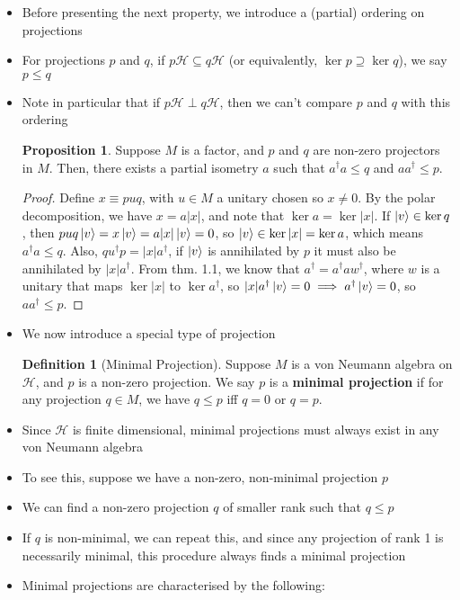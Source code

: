\documentclass[12pt,a4paper]{article}
\numberwithin{equation}{section}
\theoremstyle{definition}
\newtheorem{definition}{Definition}[section]
\theoremstyle{theorem}
\newtheorem{proposition}{Proposition}
\begin{document}
\begin{itemize}
\begin{proof}
		\end{proof}
		\item Before presenting the next property, we introduce a (partial) ordering on projections
		\item For projections $p$ and $q$, if $p\mathcal{H}\subseteq q\mathcal{H}$ (or equivalently, $\ker{p}\supseteq\ker{q}$), we say $p\leq q$
		\item Note in particular that if $p\mathcal{H}\perp q\mathcal{H}$, then we can't compare $p$ and $q$ with this ordering
		\begin{proposition}
			Suppose $M$ is a factor, and $p$ and $q$ are non-zero projectors in $M$. Then, there exists a partial isometry $a$ such that $a^{\dagger}a\leq q$ and $aa^{\dagger}\leq p$.
		\end{proposition}
		\begin{proof}
			Define $x\equiv puq$, with $u\in M$ a unitary chosen so $x\neq 0$. By the polar decomposition, we have $x=a|x|$, and note that $\ker{a}=\ker{|x|}$. If $\ket{v}\in \ker{q}$, then $puq\ket{v}=x\ket{v}=a|x|\ket{v}=0$, so $\ket{v}\in \ker{|x|}=\ker{a}$, which means $a^{\dagger}a\leq q$. Also, $qu^{\dagger}p=|x|a^{\dagger}$, if $\ket{v}$ is annihilated by $p$ it must also be annihilated by $|x|a^{\dagger}$. From thm. 1.1, we know that $a^{\dagger}=a^{\dagger}aw^{\dagger}$, where $w$ is a unitary that maps $\ker{|x|}$ to $\ker{a^{\dagger}}$, so $|x|a^{\dagger}\ket{v}=0\implies a^{\dagger}\ket{v}=0$, so $aa^{\dagger}\leq p$.
		\end{proof}
		\item We now introduce a special type of projection
		\begin{definition}[Minimal Projection]
			Suppose $M$ is a von Neumann algebra on $\mathcal{H}$, and $p$ is a non-zero projection. We say $p$ is a \textbf{minimal projection} if for any projection $q\in M$, we have $q\leq p$ iff $q=0$ or $q=p$.
		\end{definition}
		\item Since $\mathcal{H}$ is finite dimensional, minimal projections must always exist in any von Neumann algebra
		\item To see this, suppose we have a non-zero, non-minimal projection $p$
		\item We can find a non-zero projection $q$ of smaller rank such that $q\leq p$
		\item If $q$ is non-minimal, we can repeat this, and since any projection of rank 1 is necessarily minimal, this procedure always finds a minimal projection
		\item Minimal projections are characterised by the following:

\end{itemize}
\end{document}
